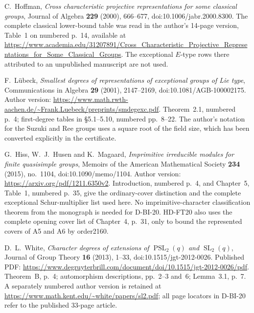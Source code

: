 C.~Hoffman, \emph{Cross characteristic projective representations
for some classical groups}, Journal of Algebra \textbf{229} (2000),
666--677, doi:10.1006/jabr.2000.8300.
The complete classical lower-bound table was read in the author's
14-page version, Table~1 on numbered p.~14, available at
\url{https://www.academia.edu/31207891/Cross_Characteristic_Projective_Representations_for_Some_Classical_Groups}.
The exceptional $E$-type rows there attributed to an unpublished
manuscript are not used.

F.~L\"ubeck, \emph{Smallest degrees of representations of exceptional
groups of Lie type}, Communications in Algebra \textbf{29} (2001),
2147--2169, doi:10.1081/AGB-100002175.
Author version: \url{https://www.math.rwth-aachen.de/~Frank.Luebeck/preprints/smdegexc.pdf}.
Theorem~2.1, numbered p.~4; first-degree tables in \S5.1--5.10,
numbered pp.~8--22.  The author's notation for the Suzuki and
Ree groups uses a square root of the field size, which has been
converted explicitly in the certificate.

G.~Hiss, W.~J.~Husen and K.~Magaard,
\emph{Imprimitive irreducible modules for finite quasisimple groups},
Memoirs of the American Mathematical Society \textbf{234} (2015),
no.~1104, doi:10.1090/memo/1104.
Author version: \url{https://arxiv.org/pdf/1211.6350v2}.
Introduction, numbered p.~4, and Chapter~5, Table~1, numbered p.~35,
give the ordinary-cover distinction and the complete exceptional
Schur-multiplier list used here.  No imprimitive-character
classification theorem from the monograph is needed for D-BI-20.
HD-FT20 also uses the complete opening cover list of Chapter~4, p.~31, only to bound the represented covers of A5 and A6 by order2160.

D.~L.~White, \emph{Character degrees of extensions of
$\operatorname{PSL}_2(q)$ and $\operatorname{SL}_2(q)$},
Journal of Group Theory \textbf{16} (2013), 1--33,
doi:10.1515/jgt-2012-0026.
Published PDF: \url{https://www.degruyterbrill.com/document/doi/10.1515/jgt-2012-0026/pdf}.
Theorem~B, p.~4; automorphism descriptions, pp.~2--3 and~6;
Lemma~3.1, p.~7.  A separately numbered author version is retained
at \url{https://www.math.kent.edu/~white/papers/sl2.pdf}; all
page locators in D-BI-20 refer to the published 33-page article.

